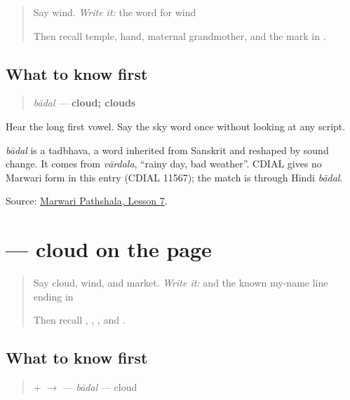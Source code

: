 \label{lesson:MW-C11-hear-baadal}



\begin{quote}
Say wind. \emph{Write it:} the word for wind

Then recall temple, hand, maternal grandmother, and the \textbf{} mark in \textbf{}.
\end{quote}

\subsection*{What to know first}
\begin{quote}
\emph{bādal} — \textbf{cloud; clouds}
\end{quote}

Hear the long first vowel. Say the sky word once without looking at any script.

\begin{cousinweb}
\emph{bādal} is a tadbhava, a word inherited from Sanskrit and reshaped by sound change. It comes from \emph{vārdala}, \textquotedblleft{}rainy day, bad weather\textquotedblright{}. CDIAL gives no Marwari form in this entry (CDIAL 11567); the match is through Hindi \emph{bādal}.
\end{cousinweb}

\begin{tcolorbox}[breakable,colback=teal!4,colframe=teal!35!black,title={Before you move on}]
Source: \href{https://www.marwaripathshala.com/marwari-lesson-7-english}{Marwari Pathshala, Lesson 7}.
\end{tcolorbox}
\section[\texorpdfstring{\mw{बादल} (bādal)}{बादल (bādal)}]{ — cloud on the page}

\label{lesson:MW-C11-baadal}



\begin{quote}
Say cloud, wind, and market. \emph{Write it:} \textbf{} and the known my-name line ending in \textbf{}

Then recall \textbf{}, \textbf{}, \textbf{}, and \textbf{}.
\end{quote}

\subsection*{What to know first}
\begin{quote}
\textbf{} + \textbf{} $\to$ \textbf{} — \emph{bādal} — cloud
\end{quote}

